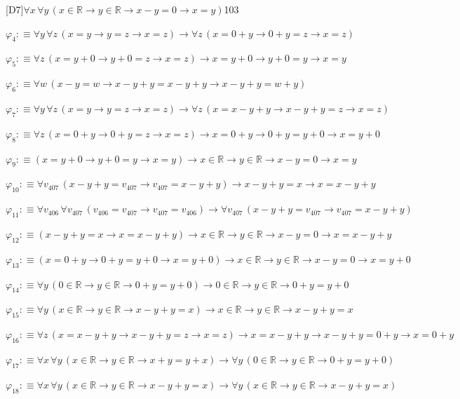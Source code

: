 \begin{fullproof}{[D7]}{$\forall x\,\forall y\,(x \in \mathbb{R} \to y \in \mathbb{R} \to x - y = 0 \to x = y)$}{103}
\begin{abbrevlist}
\item $\varphi_{4} :\equiv \forall y\,\forall z\,(x = y \to y = z \to x = z) \to \forall z\,(x = 0 + y \to 0 + y = z \to x = z)$
\item $\varphi_{5} :\equiv \forall z\,(x = y + 0 \to y + 0 = z \to x = z) \to x = y + 0 \to y + 0 = y \to x = y$
\item $\varphi_{6} :\equiv \forall w\,(x - y = w \to x - y + y = x - y + y \to x - y + y = w + y)$
\item $\varphi_{7} :\equiv \forall y\,\forall z\,(x = y \to y = z \to x = z) \to \forall z\,(x = x - y + y \to x - y + y = z \to x = z)$
\item $\varphi_{8} :\equiv \forall z\,(x = 0 + y \to 0 + y = z \to x = z) \to x = 0 + y \to 0 + y = y + 0 \to x = y + 0$
\item $\varphi_{9} :\equiv (x = y + 0 \to y + 0 = y \to x = y) \to x \in \mathbb{R} \to y \in \mathbb{R} \to x - y = 0 \to x = y$
\item $\varphi_{10} :\equiv \forall v_{407}\,(x - y + y = v_{407} \to v_{407} = x - y + y) \to x - y + y = x \to x = x - y + y$
\item $\varphi_{11} :\equiv \forall v_{406}\,\forall v_{407}\,(v_{406} = v_{407} \to v_{407} = v_{406}) \to \forall v_{407}\,(x - y + y = v_{407} \to v_{407} = x - y + y)$
\item $\varphi_{12} :\equiv (x - y + y = x \to x = x - y + y) \to x \in \mathbb{R} \to y \in \mathbb{R} \to x - y = 0 \to x = x - y + y$
\item $\varphi_{13} :\equiv (x = 0 + y \to 0 + y = y + 0 \to x = y + 0) \to x \in \mathbb{R} \to y \in \mathbb{R} \to x - y = 0 \to x = y + 0$
\item $\varphi_{14} :\equiv \forall y\,(0 \in \mathbb{R} \to y \in \mathbb{R} \to 0 + y = y + 0) \to 0 \in \mathbb{R} \to y \in \mathbb{R} \to 0 + y = y + 0$
\item $\varphi_{15} :\equiv \forall y\,(x \in \mathbb{R} \to y \in \mathbb{R} \to x - y + y = x) \to x \in \mathbb{R} \to y \in \mathbb{R} \to x - y + y = x$
\item $\varphi_{16} :\equiv \forall z\,(x = x - y + y \to x - y + y = z \to x = z) \to x = x - y + y \to x - y + y = 0 + y \to x = 0 + y$
\item $\varphi_{17} :\equiv \forall x\,\forall y\,(x \in \mathbb{R} \to y \in \mathbb{R} \to x + y = y + x) \to \forall y\,(0 \in \mathbb{R} \to y \in \mathbb{R} \to 0 + y = y + 0)$
\item $\varphi_{18} :\equiv \forall x\,\forall y\,(x \in \mathbb{R} \to y \in \mathbb{R} \to x - y + y = x) \to \forall y\,(x \in \mathbb{R} \to y \in \mathbb{R} \to x - y + y = x)$

\end{abbrevlist}
\end{fullproof}
